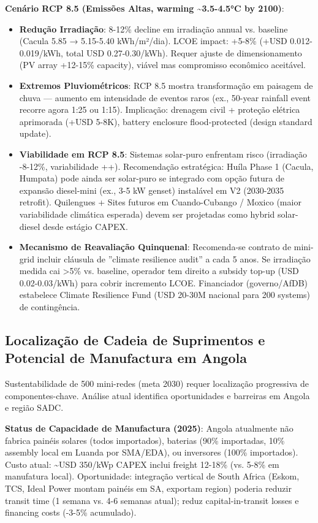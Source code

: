 \documentclass[12pt, a4paper]{article}
\begin{document}
\textbf{Cenário RCP 8.5 (Emissões Altas, warming \textasciitilde{}3.5-4.5°C by 2100)}:
\begin{itemize}
\item \textbf{Redução Irradiação}: 8-12\% decline em irradiação annual vs. baseline (Cacula 5.85 → 5.15-5.40 kWh/m²/dia). LCOE impact: +5-8\% (+USD 0.012-0.019/kWh, total USD 0.27-0.30/kWh). Requer ajuste de dimensionamento (PV array +12-15\% capacity), viável mas compromisso econômico aceitável.

\item \textbf{Extremos Pluviométricos}: RCP 8.5 mostra transformação em paisagem de chuva — aumento em intensidade de eventos raros (ex., 50-year rainfall event recorre agora 1:25 ou 1:15). Implicação: drenagem civil + proteção elétrica aprimorada (+USD 5-8K), battery enclosure flood-protected (design standard update).

\item \textbf{Viabilidade em RCP 8.5}: Sistemas solar-puro enfrentam risco (irradiação -8-12\%, variabilidade ++). Recomendação estratégica: Huíla Phase 1 (Cacula, Humpata) pode ainda ser solar-puro se integrado com opção futura de expansão diesel-mini (ex., 3-5 kW genset) instalável em V2 (2030-2035 retrofit). Quilengues + Sites futuros em Cuando-Cubango / Moxico (maior variabilidade climática esperada) devem ser projetadas como hybrid solar-diesel desde estágio CAPEX.

\item \textbf{Mecanismo de Reavaliação Quinquenal}: Recomenda-se contrato de mini-grid incluir cláusula de ''climate resilience audit'' a cada 5 anos. Se irradiação medida cai >5\% vs. baseline, operador tem direito a subsidy top-up (USD 0.02-0.03/kWh) para cobrir incremento LCOE. Financiador (governo/AfDB) estabelece Climate Resilience Fund (USD 20-30M nacional para 200 systems) de contingência.
\end{itemize}

\subsection{Localização de Cadeia de Suprimentos e Potencial de Manufactura em Angola}

Sustentabilidade de 500 mini-redes (meta 2030) requer localização progressiva de componentes-chave. Análise atual identifica oportunidades e barreiras em Angola e região SADC.

\textbf{Status de Capacidade de Manufactura (2025)}: Angola atualmente não fabrica painéis solares (todos importados), baterias (90\% importadas, 10\% assembly local em Luanda por SMA/EDA), ou inversores (100\% importados). Custo atual: \textasciitilde{}USD 350/kWp CAPEX inclui freight 12-18\% (vs. 5-8\% em manufatura local). Oportunidade: integração vertical de South Africa (Eskom, TCS, Ideal Power montam painéis em SA, exportam region) poderia reduzir transit time (1 semana vs. 4-6 semanas atual); reduz capital-in-transit losses e financing costs (-3-5\% acumulado).
\end{document}
